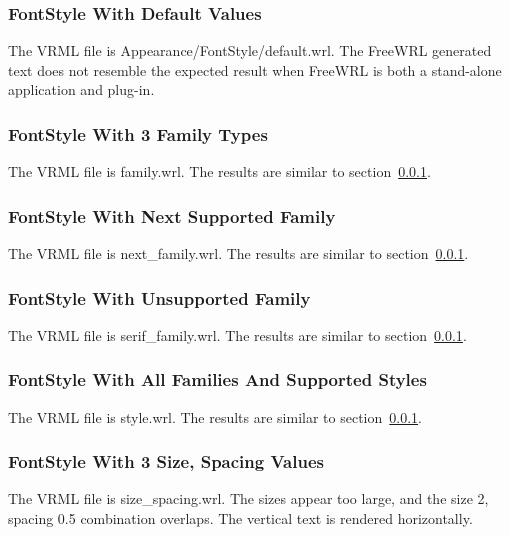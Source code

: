 \documentclass[12pt,letterpaper]{article}
\newcommand{\FSA}{FontStyle With Default Values}
\newcommand{\FSB}{FontStyle With 3 Family Types}
\newcommand{\FSC}{FontStyle With Next Supported Family}
\newcommand{\FSD}{FontStyle With Unsupported Family}
\newcommand{\FSE}{FontStyle With All Families And Supported Styles}
\newcommand{\FSF}{FontStyle With 3 Size, Spacing Values}
\begin{document}
\subsubsection{\FSA}
\label{sec:fs-default}
The VRML file is Appearance/FontStyle/default.wrl.
The FreeWRL generated text does not resemble the expected result when FreeWRL is both 
a stand-alone application and plug-in.

\subsubsection{\FSB}
\label{sec:3-families}
The VRML file is family.wrl.\newline
The results are similar to section~\ref{sec:fs-default}.

\subsubsection{\FSC}
The VRML file is next\_family.wrl.\newline
The results are similar to section~\ref{sec:fs-default}.

\subsubsection{\FSD}
The VRML file is serif\_family.wrl.\newline
The results are similar to section~\ref{sec:fs-default}.

\subsubsection{\FSE}
The VRML file is style.wrl.\newline
The results are similar to section~\ref{sec:fs-default}.

\subsubsection{\FSF}
The VRML file is size\_spacing.wrl.\newline
The sizes appear too large, and the size 2, spacing 0.5 combination overlaps.
The vertical text is rendered horizontally.  
\end{document}

